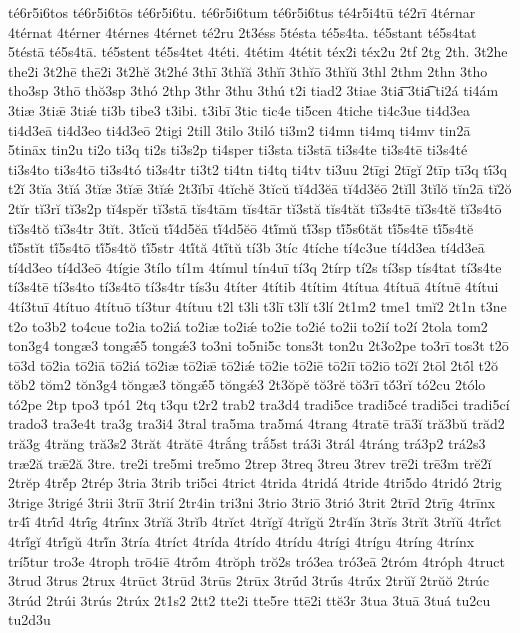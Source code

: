 {té6r5i6tos
té6r5i6tōs
té6r5i6tu.
té6r5i6tum
té6r5i6tus
té4r5i4tū
té2rī
4térnar
4térnat
4térner
4térnes
4térnet
té2ru
2t3éss
5tésta
té5s4ta.
té5stant
té5s4tat
5téstā
té5s4tā.
té5stent
té5s4tet
4téti.
4tétim
4tétit
téx2i
téx2u
2tf
2tg
2th.
3t2he
the2i
3t2hē
thē2i
3t2hĕ
3t2hé
3thī
3thĭă
3thĭī
3thĭō
3thĭŭ
3thl
2thm
2thn
3tho
tho3sp
3thō
thŏ3sp
3thó
2thp
3thr
3thu
3thú
t2i
tiad2
3tiae
3tia͞
3tia͡
ti2á
ti4ám
3tiæ
3tiǣ
3tiǽ
ti3b
tibe3
t3ibi.
t3ibī
3tic
tic4e
ti5cen
4tiche
ti4c3ue
ti4d3ea
ti4d3eā
ti4d3eo
ti4d3eō
2tigi
2till
3tilo
3tiló
ti3m2
ti4mn
ti4mq
ti4mv
tin2ā
5tināx
tin2u
ti2o
ti3q
ti2s
ti3s2p
ti4sper
ti3sta
ti3stā
ti3s4te
ti3s4tē
ti3s4té
ti3s4to
ti3s4tō
ti3s4tó
ti3s4tr
ti3t2
ti4tn
ti4tq
ti4tv
ti3uu
2tīgi
2tīgĭ
2tīp
tī3q
tī́3q
t2ĭ
3tĭa
3tĭá
3tĭæ
3tĭǣ
3tĭǽ
2t3ĭbī
4tĭchĕ
3tĭcŭ
tĭ4d3ĕā
tĭ4d3ĕō
2tĭll
3tĭlŏ
tĭn2ā
tĭ2ŏ
2tĭr
tĭ3rĭ
tĭ3s2p
tĭ4spĕr
tĭ3stā
tĭs4tām
tĭs4tār
tĭ3stă
tĭs4tăt
tĭ3s4tē
tĭ3s4tĕ
tĭ3s4tō
tĭ3s4tŏ
tĭ3s4tr
3tĭt.
3tĭ́cŭ
tĭ́4d5ĕā
tĭ́4d5ĕō
4tĭ́mŭ
tĭ́3sp
tĭ́5s6tăt
tĭ́5s4tē
tĭ́5s4tĕ
tĭ́5stĭt
tĭ́5s4tō
tĭ́5s4tŏ
tĭ́5str
4tĭ́tă
4tĭ́tŭ
tí3b
3tíc
4tíche
tí4c3ue
tí4d3ea
tí4d3eā
tí4d3eo
tí4d3eō
4tígie
3tílo
tí1m
4tímul
tín4uī
tí3q
2tírp
tí2s
tí3sp
tís4tat
tí3s4te
tí3s4tē
tí3s4to
tí3s4tō
tí3s4tr
tís3u
4títer
4títib
4títim
4títua
4títuā
4títuē
4títui
4tí3tuī
4títuo
4títuō
tí3tur
4títuu
t2l
t3li
t3lī
t3lĭ
t3lí
2t1m2
tme1
tmĭ2
2t1n
t3ne
t2o
to3b2
to4cue
to2ia
to2iá
to2iæ
to2iǽ
to2ie
to2ié
to2ii
to2ií
to2í
2tola
tom2
ton3g4
tongæ3
tongǣ́5
tongǽ3
to3ni
to5ni5c
tons3t
ton2u
2t3o2pe
to3rī
tos3t
t2ō
tō3d
tō2ia
tō2iā
tō2iá
tō2iæ
tō2iǣ
tō2iǽ
tō2ie
tō2iē
tō2iī
tō2iō
tō2ĭ
2tōl
2tṓl
t2ŏ
tŏb2
tŏm2
tŏn3g4
tŏngæ3
tŏngǣ́5
tŏngǽ3
2t3ŏpĕ
tŏ3rĕ
tŏ3rī
tŏ́3rĭ
tó2cu
2tólo
tó2pe
2tp
tpo3
tpó1
2tq
t3qu
t2r2
trab2
tra3d4
tradi5ce
tradi5cé
tradi5ci
tradi5cí
trado3
tra3e4t
tra3g
tra3i4
3tral
tra5ma
tra5má
4trang
4tratē
trā3ĭ
tră3bŭ
trăd2
tră3g
4trăng
tră3s2
3trăt
4trătē
4trắng
trắ5st
trá3i
3trál
4tráng
trá3p2
trá2s3
træ2ă
trǣ2ă
3tre.
tre2i
tre5mi
tre5mo
2trep
3treq
3treu
3trev
trē2i
trē3m
trĕ2ĭ
2trĕp
4trĕ́p
2trép
3tria
3trib
tri5ci
4trict
4trida
4tridá
4tride
4tri5do
4tridó
2trig
3trige
3trigé
3trii
3triī
3trií
2tr4in
tri3ni
3trio
3triō
3trió
3trit
2trīd
2trīg
4trīnx
tr4ī́
4trī́d
4trī́g
4trī́nx
3trĭă
3trĭb
4trĭct
4trĭgĭ
4trĭgŭ
2tr4ĭn
3trĭs
3trĭt
3trĭŭ
4trĭ́ct
4trĭ́gĭ
4trĭ́gŭ
4trĭ́n
3tría
4tríct
4trída
4trído
4trídu
4trígi
4trígu
4tríng
4trínx
trí5tur
tro3e
4troph
trō4iē
4trṓm
4trŏph
trŏ2s
tró3ea
tró3eā
2tróm
4tróph
4truct
3trud
3trus
2trux
4trūct
3trūd
3trūs
2trūx
3trū́d
3trū́s
4trū́x
2trŭĭ
2trŭŏ
2trúc
3trúd
2trúi
3trús
2trúx
2t1s2
2tt2
tte2i
tte5re
ttē2i
ttĕ3r
3tua
3tuā
3tuá
tu2cu
tu2d3u
}
